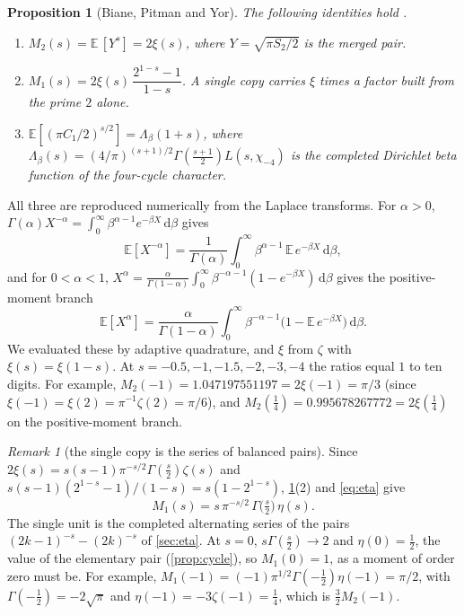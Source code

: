 \documentclass[11pt]{article}
\newtheorem{proposition}[theorem]{Proposition}
\theoremstyle{definition}\newtheorem{definition}[theorem]{Definition}
\theoremstyle{remark}\newtheorem{remark}[theorem]{Remark}
\newcommand{\dd}{\,\mathrm d}\newcommand{\e}{\mathrm e}
\begin{document}
\begin{proposition}[Biane, Pitman and Yor]\label{prop:bpy}
The following identities hold \cite{BPY}.
\begin{enumerate}
\item $M_2(s)=\mathbb E\,[Y^s]=2\xi(s)$, where $Y=\sqrt{\pi S_2/2}$ is the merged pair.
\item $M_1(s)=2\xi(s)\,\dfrac{2^{1-s}-1}{1-s}$. A single copy carries $\xi$ times a factor built from the prime $2$ alone.
\item $\mathbb E[(\pi C_1/2)^{s/2}]=\Lambda_\beta(1+s)$, where $\Lambda_\beta(s)=(4/\pi)^{(s+1)/2}\Gamma(\tfrac{s+1}2)L(s,\chi_{-4})$ is the completed Dirichlet beta function of the four-cycle character.
\end{enumerate}
\end{proposition}
All three are reproduced numerically from the Laplace transforms. For $\alpha>0$, $\Gamma(\alpha)X^{-\alpha}=\int_0^\infty\beta^{\alpha-1}e^{-\beta X}\dd\beta$ gives
\[
\mathbb E[X^{-\alpha}]=\frac1{\Gamma(\alpha)}\int_0^\infty\beta^{\alpha-1}\,\mathbb E\,e^{-\beta X}\dd\beta ,
\]
and for $0<\alpha<1$, $X^\alpha=\frac \alpha{\Gamma(1-\alpha)}\int_0^\infty\beta^{-\alpha-1}(1-e^{-\beta X})\dd\beta$ gives the positive-moment branch
\[
\mathbb E[X^{\alpha}]=\frac \alpha{\Gamma(1-\alpha)}\int_0^\infty\beta^{-\alpha-1}\bigl(1-\mathbb E\,e^{-\beta X}\bigr)\dd\beta .
\]
We evaluated these by adaptive quadrature, and $\xi$ from $\zeta$ with $\xi(s)=\xi(1-s)$. At $s=-0.5,-1,-1.5,-2,-3,-4$ the ratios equal $1$ to ten digits. For example, $M_2(-1)=1.047197551197=2\xi(-1)=\pi/3$ (since $\xi(-1)=\xi(2)=\pi^{-1}\zeta(2)=\pi/6$), and $M_2(\tfrac14)=0.995678267772=2\xi(\tfrac14)$ on the positive-moment branch.

\begin{remark}[the single copy is the series of balanced pairs]\label{rem:eta}
Since $2\xi(s)=s(s-1)\pi^{-s/2}\Gamma(\frac s2)\zeta(s)$ and $s(s-1)(2^{1-s}-1)/(1-s)=s(1-2^{1-s})$, \cref{prop:bpy}(2) and \eqref{eq:eta} give
\[
M_1(s)=s\,\pi^{-s/2}\,\Gamma\bigl(\tfrac s2\bigr)\,\eta(s).
\]
The single unit is the completed alternating series of the pairs $(2k-1)^{-s}-(2k)^{-s}$ of \cref{sec:eta}. At $s=0$, $s\Gamma(\frac s2)\to2$ and $\eta(0)=\frac12$, the value of the elementary pair (\cref{prop:cycle}), so $M_1(0)=1$, as a moment of order zero must be. For example, $M_1(-1)=(-1)\pi^{1/2}\Gamma(-\frac12)\eta(-1)=\pi/2$, with $\Gamma(-\frac12)=-2\sqrt\pi$ and $\eta(-1)=-3\zeta(-1)=\frac14$, which is $\frac32M_2(-1)$.
\end{remark}
\end{document}
